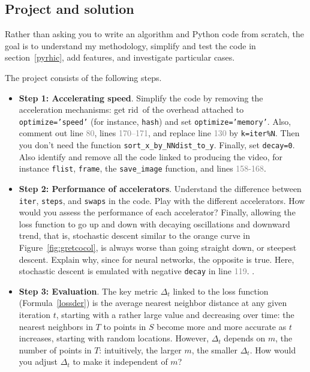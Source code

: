 \documentclass[oneside,10pt]{book}
\begin{document}
\subsection{Project and solution}

Rather than asking you to write an algorithm and Python code from scratch, the goal is to understand my methodology, 
simplify and test the code in section~\ref{pyrhic}, add features, and investigate particular cases. 

\noindent The project consists of the following steps.
\vspace{1ex}
\begin{itemize}
\item[] {\bf Step 1:  Accelerating speed}. Simplify the code by removing the acceleration mechanisms: get rid~of the overhead attached to \texttt{optimize='speed'} 
 (for instance, \texttt{hash}) and set \texttt{optimize='memory'}. Also,  comment out line \textcolor{gray}{80}, 
 lines \textcolor{gray}{170--171}, and replace line \textcolor{gray}{130} by \texttt{k=iter\%N}. Then you don't need the
 function \texttt{sort\_x\_by\_NNdist\_to\_y}. Finally, set \texttt{decay=0}. Also identify and remove all the code linked to producing the video,
 for instance \texttt{flist}, \texttt{frame}, the \texttt{save\_image} function, and lines \textcolor{gray}{158-168}.
\vspace{1ex}
\item[] {\bf Step 2:  Performance of accelerators}. Understand the difference between \texttt{iter}, \texttt{steps}, and \texttt{swaps} in the code. 
Play with the different accelerators. How would you assess the performance of each accelerator? Finally, allowing the loss function to go up and down with
 decaying oscillations and downward trend, that is, 
\textcolor{index}{stochastic descent} similar to the orange curve in Figure~\ref{fig:gretcocol}, is always worse than going straight down, or \textcolor{index}{steepest descent}. Explain why, since for neural networks, the opposite is true. Here, stochastic descent is emulated with negative \texttt{decay} in line \textcolor{gray}{119}.
\vspace{1ex}.
 \item[] {\bf Step 3:  Evaluation}. The key metric $\Delta_t$ linked to the 
\textcolor{index}{loss function} (Formula~\ref{lossder}) is the average nearest neighbor distance at any given iteration $t$, 
starting with a rather large value and decreasing over time:
 the nearest neighbors in $T$ to points in $S$ become more and more accurate as $t$ increases, starting with random locations. However,  
$\Delta_t$ depends on $m$, the number of points in $T$: intuitively, the larger $m$, the smaller $\Delta_t$. How would you adjust $\Delta_t$ to make it independent of $m$? 
\end{itemize}
\vspace{1ex}
\end{document}
